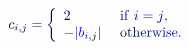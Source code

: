 \documentclass[12pt]{article}
\begin{document}
\makeatletter
\renewcommand*{\@textcolor}[3]{%
  \protect\leavevmode
  \begingroup
    \color#1{#2}#3%
  \endgroup
}
\makeatother
\begin{displaymath}
\mathcolor[RGB]{0,0,15}{c} _ { \mathcolor[RGB]{0,0,30}{i} \mathcolor[RGB]{0,0,45}{,} \mathcolor[RGB]{0,0,60}{j} } \mathcolor[RGB]{0,0,75}{=} \mathcolor[RGB]{0,0,90}{\left\{} \begin{array} {ll} { \mathcolor[RGB]{0,0,105}{2} } & { \mathrm { ~ \mathcolor[RGB]{0,0,120}{i} \mathcolor[RGB]{0,0,135}{f} ~ } \mathcolor[RGB]{0,0,150}{i} \mathcolor[RGB]{0,0,165}{=} \mathcolor[RGB]{0,0,180}{j} \mathcolor[RGB]{0,0,195}{,} } \\ { \mathcolor[RGB]{0,0,210}{-} \mathcolor[RGB]{0,0,225}{|} \mathcolor[RGB]{0,0,240}{b} _ { \mathcolor[RGB]{0,0,255}{i} \mathcolor[RGB]{0,15,0}{,} \mathcolor[RGB]{0,15,15}{j} } \mathcolor[RGB]{0,15,30}{|} } & { \mathrm { ~ \mathcolor[RGB]{0,15,45}{o} \mathcolor[RGB]{0,15,60}{t} \mathcolor[RGB]{0,15,75}{h} \mathcolor[RGB]{0,15,90}{e} \mathcolor[RGB]{0,15,105}{r} \mathcolor[RGB]{0,15,120}{w} \mathcolor[RGB]{0,15,135}{i} \mathcolor[RGB]{0,15,150}{s} \mathcolor[RGB]{0,15,165}{e} } \mathcolor[RGB]{0,15,180}{.} } \end{array} \mathcolor[RGB]{0,15,195}{\right.}
\end{displaymath}
\end{document}
